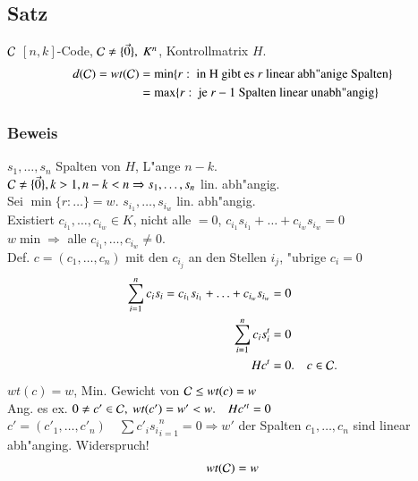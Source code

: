 %
%
\subsection{Satz}
$\mathcal{C}$ $[n,k]$-Code, $\Code \neq \lbrace \vec{0} \rbrace,\ K^n$, Kontrollmatrix $H$.\\
\begin{align*}
d(\mathcal{C})=wt(\mathcal{C}) &= \min \lbrace r : \text{ in H gibt es $r$ linear abh"anige Spalten}  \rbrace \\
&= \max \lbrace r : \text{ je $r-1$ Spalten linear unabh"angig} \rbrace
\end{align*}

\subsubsection{Beweis}
$s_1,\ldots,s_n$ Spalten von $H$, L"ange $n-k$. \\
$\mathcal{C} \neq \lbrace \vec{0} \rbrace, k > 1, n-k<n \Rightarrow s_1,\ldots,s_n$ lin. abh"angig.\\
Sei $\min \lbrace r: \ldots \rbrace = w$. $s_{i_1},\ldots, s_{i_w}$ lin. abh"angig. \\
Existiert $c_{i_1},\ldots,c_{i_w} \in K$, nicht alle $=0$, $c_{i_1} s_{i_1}+\ldots+ c_{i_w} s_{i_w}=0$ \\
$w \min \Rightarrow$ alle $c_{i_1},\ldots, c_{i_w} \neq 0$. \\
Def. $c=(c_1, \ldots,  c_n)$ mit den $c_{i_j}$ an den Stellen $i_j$, "ubrige $c_i=0$
\begin{align*}
	\sum^n_{i=1}{c_i s_i} = c_{i_1} s_{i_1} + \ldots + c_{i_w} s_{i_w} &=0\\
	\sum^n_{i=1}{c_i s_i^t}&=0 \\
	Hc^t&=0. \quad c \in \mathcal{C} .
\end{align*}
$wt(c)=w$, Min. Gewicht von $\mathcal{C} \leq wt(c)=w$ \\
Ang. es ex. $0 \neq c' \in \mathcal{C},\ wt(c')=w' < w.\quad Hc'^t=0$\\
$c'=(c'_1, \ldots, c'_n) \quad \sum{c'_i s_i}^n_{i=1}=0 \Rightarrow w'$ der Spalten $c_1,\ldots,c_n$ sind linear abh"anging. Widerspruch! \\
\[
	wt(\mathcal{C})=w
\]

